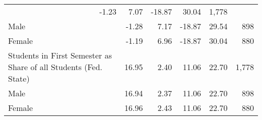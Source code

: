 \documentclass{article}
\begin{document}
\begin{table}[!h]
{\begin{tabular}{llllll}
  \multicolumn{1}{r}{-1.23} &
  \multicolumn{1}{r}{7.07} &
  \multicolumn{1}{r}{-18.87} &
  \multicolumn{1}{r}{30.04} &
  \multicolumn{1}{r}{1,778} \\
\multicolumn{1}{l}{\hspace{1em}Male} &
  \multicolumn{1}{r}{-1.28} &
  \multicolumn{1}{r}{7.17} &
  \multicolumn{1}{r}{-18.87} &
  \multicolumn{1}{r}{29.54} &
  \multicolumn{1}{r}{898} \\
\multicolumn{1}{l}{\hspace{1em}Female} &
  \multicolumn{1}{r}{-1.19} &
  \multicolumn{1}{r}{6.96} &
  \multicolumn{1}{r}{-18.87} &
  \multicolumn{1}{r}{30.04} &
  \multicolumn{1}{r}{880} \\
\multicolumn{1}{l}{Students in First Semester as Share of all Students (Fed. State)} &
  \multicolumn{1}{r}{16.95} &
  \multicolumn{1}{r}{2.40} &
  \multicolumn{1}{r}{11.06} &
  \multicolumn{1}{r}{22.70} &
  \multicolumn{1}{r}{1,778} \\
\multicolumn{1}{l}{\hspace{1em}Male} &
  \multicolumn{1}{r}{16.94} &
  \multicolumn{1}{r}{2.37} &
  \multicolumn{1}{r}{11.06} &
  \multicolumn{1}{r}{22.70} &
  \multicolumn{1}{r}{898} \\
\multicolumn{1}{l}{\hspace{1em}Female} &
  \multicolumn{1}{r}{16.96} &
  \multicolumn{1}{r}{2.43} &
  \multicolumn{1}{r}{11.06} &
  \multicolumn{1}{r}{22.70} &
  \multicolumn{1}{r}{880} \\
\bottomrule
\end{tabular}}
\end{table}
\end{document}
